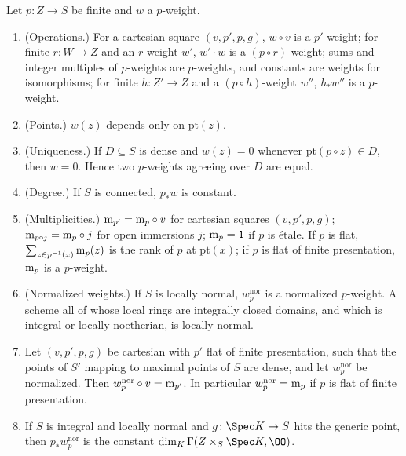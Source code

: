 \begin{proposition}[Weights]\label{prop:pf:steps2:wts}
Let $p\colon Z\to S$ be finite and $w$ a $p$-weight.
\begin{enumerate}[label=\textup{(\alph*)},nosep]
\item \textup{(Operations.)} For a cartesian square $(v,p',p,g)$, $w\circ v$ is a $p'$-weight; for finite
  $r\colon W\to Z$ and an $r$-weight $w'$, $w'\cdot w$ is a $(p\circ r)$-weight; sums and integer
  multiples of $p$-weights are $p$-weights, and constants are weights for isomorphisms; for finite
  $h\colon Z'\to Z$ and a $(p\circ h)$-weight $w''$, $h_\ast w''$ is a $p$-weight.
\item \textup{(Points.)} $w(z)$ depends only on $\mathrm{pt}(z)$.
\item \textup{(Uniqueness.)} If $D\subseteq S$ is dense and $w(z)=0$ whenever $\mathrm{pt}(p\circ z)\in D$,
  then $w=0$. Hence two $p$-weights agreeing over $D$ are equal.
\item \textup{(Degree.)} If $S$ is connected, $p_\ast w$ is constant.
\item \textup{(Multiplicities.)} $\mathrm{m}_{p'}=\mathrm{m}_p\circ v$ for cartesian squares $(v,p',p,g)$;
  $\mathrm{m}_{p\circ j}=\mathrm{m}_p\circ j$ for open immersions $j$; $\mathrm{m}_p=1$ if $p$ is \'etale. If
  $p$ is flat, $\sum_{z\in p^{-1}(x)}\mathrm{m}_p(z)$ is the rank of $p$ at $\mathrm{pt}(x)$; if $p$ is
  flat of finite presentation, $\mathrm{m}_p$ is a $p$-weight.
\item \textup{(Normalized weights.)} If $S$ is locally normal, $w^{\mathrm{nor}}_p$ is a normalized
  $p$-weight. A scheme all of whose local rings are integrally closed domains, and which is integral or
  locally noetherian, is locally normal.
\item Let $(v,p',p,g)$ be cartesian with $p'$ flat of finite presentation, such that the points of $S'$
  mapping to maximal points of $S$ are dense, and let $w^{\mathrm{nor}}_p$ be normalized. Then
  $w^{\mathrm{nor}}_p\circ v=\mathrm{m}_{p'}$. In particular $w^{\mathrm{nor}}_p=\mathrm{m}_p$ if $p$ is flat
  of finite presentation.
\item If $S$ is integral and locally normal and $g\colon\Spec K\to S$ hits the generic point, then
  $p_\ast w^{\mathrm{nor}}_p$ is the constant $\dim_K\Gamma(Z\times_S\Spec K,\OO)$.
\end{enumerate}
\end{proposition}

